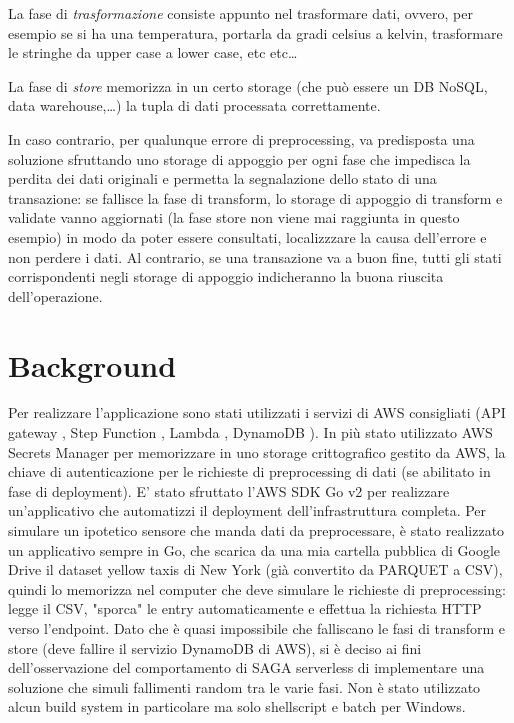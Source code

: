 \documentclass[
    sigconf, 
    screen=false, 
    acmthm=false, 
    nonacm
]{acmart}
\begin{document}
La fase di \textit{trasformazione} consiste appunto nel trasformare dati, ovvero, per esempio se si ha una temperatura,
portarla da gradi celsius a kelvin, trasformare le stringhe da upper case a lower case, etc etc\dots

La fase di \textit{store} memorizza in un certo storage (che può essere un DB NoSQL, data warehouse,\dots) la tupla di dati processata correttamente.

In caso contrario, per qualunque errore di preprocessing, va predisposta una soluzione sfruttando uno storage di appoggio
per ogni fase che impedisca la perdita dei dati originali e permetta la segnalazione dello stato di 
una transazione: se fallisce la fase di transform, lo storage di appoggio di transform e validate vanno 
aggiornati (la fase store non viene mai raggiunta in questo esempio) in modo da poter essere consultati, 
localizzzare la causa dell'errore e non perdere i dati. Al 
contrario, se una transazione va a buon fine, tutti gli stati corrispondenti
negli storage di appoggio indicheranno la buona riuscita dell'operazione.

\section{Background}
Per realizzare l'applicazione sono stati utilizzati i servizi di AWS \cite{aws} consigliati (API gateway 
\cite{awsapig}, Step Function \cite{awssfn}, 
Lambda \cite{awslambda}, DynamoDB \cite{awsdyndb}). In più stato utilizzato AWS Secrets Manager \cite{awssm} per memorizzare in uno storage crittografico gestito da AWS, la chiave di autenticazione per le 
richieste di preprocessing di dati (se abilitato in fase di deployment). E' stato
sfruttato l'AWS SDK Go v2 \cite{awssdkgo} per realizzare un'applicativo che automatizzi il deployment dell'infrastruttura completa. 
Per simulare un ipotetico sensore che manda dati da preprocessare, è stato realizzato un applicativo sempre in Go,
che scarica da una mia cartella pubblica di Google Drive il dataset yellow taxis di New York \cite{nyctlctrip} (già 
convertito da PARQUET a CSV), quindi lo memorizza
nel computer che deve simulare le richieste di preprocessing: legge il CSV, "sporca" le entry 
automaticamente e effettua la richiesta HTTP verso l'endpoint. 
Dato che è quasi impossibile che falliscano le
fasi di transform e store (deve fallire il servizio DynamoDB di AWS), si è deciso ai fini dell'osservazione
del comportamento di SAGA serverless di implementare una soluzione che simuli fallimenti random tra le varie fasi.
Non è stato utilizzato alcun build system in particolare ma solo shellscript e batch per Windows.
\end{document}
